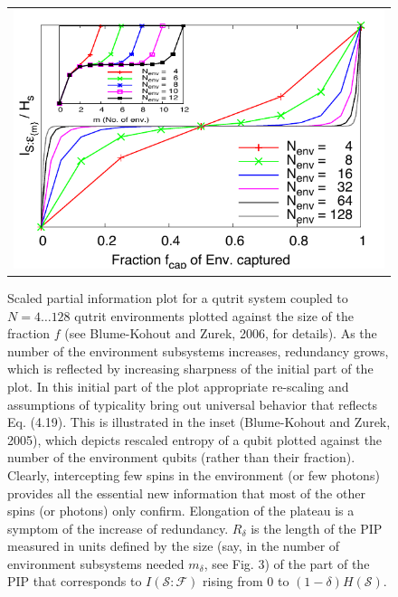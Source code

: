 \documentclass[aps,twocolumn,rmp,epsfig]{revtex4}
\def\FCW{0.98\columnwidth}
\newcommand{\cS}        {{\mathcal S}}
\newcommand{\+}         {\dagger}
\newcommand\cF{{\mathcal F}}
\begin{document}
{\begin{figure}[tb]
\begin{tabular}{l}
\vspace{-0.15in} 
\includegraphics[width=\FCW]{NSPIPs_3x3.pdf}\\
\end{tabular}
\caption{Scaled partial information plot for a qutrit system coupled to $N=4\ldots128$ qutrit 
environments plotted against the size of the fraction $f$ (see Blume-Kohout and Zurek, 2006, 
for details). As the number of the environment subsystems increases, redundancy grows, which 
is reflected by increasing sharpness of the initial part of the plot. In this initial part of the plot 
appropriate re-scaling and assumptions of typicality bring out universal behavior that reflects 
Eq. (4.19). This is illustrated in the inset (Blume-Kohout and Zurek, 2005), which depicts rescaled 
entropy of a qubit plotted against the number of the environment qubits (rather than their fraction). Clearly, intercepting few 
spins in the environment (or few photons) provides all the essential new information that most 
of the other spins (or photons) only confirm. Elongation of the plateau is a symptom of the increase 
of redundancy. $R_\delta$ is the length of the PIP measured in units defined by the size 
(say, in the number of environment subsystems needed $m_\delta$, see Fig. 3) of the part  
of the PIP that corresponds to $I(\cS:\cF)$ rising from 0 to $(1-\delta) H(\cS)$. 
}
\label{SpinPIP}
\end{figure}


}
\end{document}
